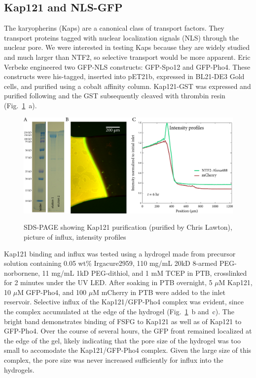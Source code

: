 \subsection{Kap121 and NLS-GFP}
The karyopherins (Kaps) are a canonical class of transport factors.  They transport proteins tagged with nuclear localization signals (NLS) through the nuclear pore.  We were interested in testing Kaps because they are widely studied and much larger than NTF2, so selective transport would be more apparent.  Eric Verbeke engineered two GFP-NLS constructs: GFP-Spo12 and GFP-Pho4.  These constructs were his-tagged, inserted into pET21b, expressed in BL21-DE3 Gold cells, and purified using a cobalt affinity column. 
Kap121-GST was expressed and purified following \cite{tetenbaum-novatt12} and the GST subsequently cleaved with thrombin resin (Fig.~\ref{fig:Kap121}~a).
\begin{figure} %
\caption{SDS-PAGE showing Kap121 purification (purified by Chris Lawton), picture of influx, intensity profiles}
\centering
\includegraphics[width=\textwidth]{figs/ch03/Kap121}
\label{fig:Kap121}
\end{figure} %


Kap121 binding and influx was tested using a hydrogel made from precursor solution containing 0.05 wt\% Irgacure2959, 110 mg/mL 20kD 8-armed PEG-norbornene, 11 mg/mL 1kD PEG-dithiol, and 1 mM TCEP in PTB, crosslinked for 2 minutes under the UV LED.  After soaking in PTB overnight, 5 $\mu$M Kap121, 10 $\mu$M GFP-Pho4, and 100 $\mu$M mCherry in PTB were added to the inlet reservoir.  Selective influx of the Kap121/GFP-Pho4 complex was evident, since the complex accumulated at the edge of the hydrogel (Fig.~\ref{fig:Kap121}~b and~c).  The bright band demonstrates binding of FSFG to Kap121 as well as of Kap121 to GFP-Pho4.  Over the course of several hours, the GFP front remained localized at the edge of the gel, likely indicating that the pore size of the hydrogel was too small to accomodate the Kap121/GFP-Pho4 complex.  Given the large size of this complex, the pore size was never increased sufficiently for influx into the hydrogels.


